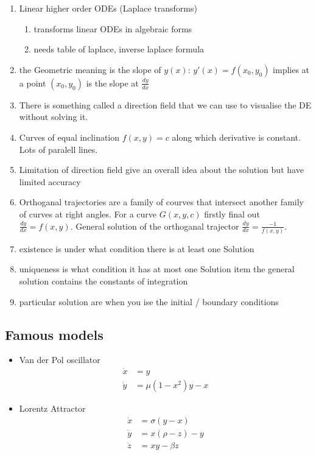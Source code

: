 \documentclass{article}
\newcommand{\di}{\frac{dy}{dx}}
\begin{document}
\begin{enumerate}
  \item Linear higher order ODEs (Laplace transforms)
  \begin{enumerate}
    \item transforms linear ODEs in algebraic forms
    \item needs table of laplace, inverse laplace formula
  \end{enumerate}
  \item the Geometric meaning is the slope of $y(x)$: $y'(x) = f(x_0, y_0)$ implies at a point $ (x_0, y_0)$ is the slope at $\di$
  \item There is something called a direction field that we can use to visualise the DE without solving it.
  \item Curves of equal inclination $f(x, y) = c$ along which derivative is constant. Lots of paralell lines.
  \item Limitation of direction field give an overall idea about the solution but have limited accuracy
  \item Orthoganal trajectories are a family of courves that intersect another family of curves at right angles.
  For a curve $G(x, y, c) $ firstly final out $\di = f(x, y)$. General solution of the orthoganal trajector $\di = \frac{-1}{f(x, y)}$.
  \item existence is under what condition there is at least one Solution
  \item uniqueness is what condition it has at most one Solution
  item the general solution contains the constants of integration
  \item particular solution are when you ise the initial / boundary conditions
\end{enumerate}

\subsection{Famous models}
\begin{itemize}
  \item Van der Pol oscillator
  $$\begin{aligned}
    \dot x &= y \\
    \dot{y} &= \mu (1 - x^2)y - x
  \end{aligned}$$
  \item Lorentz Attractor
  $$\begin{aligned}
    \dot x &= \sigma (y - x)\\
    \dot y &= x (\rho - z) - y \\
    \dot z &= xy - \beta z \\
  \end{aligned}$$
\end{itemize}
\end{document}
